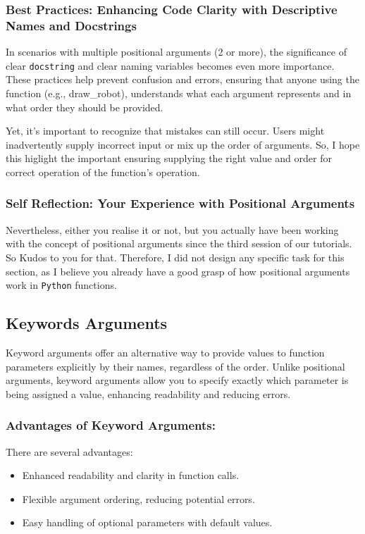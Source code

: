 \subsubsection{Best Practices: Enhancing Code Clarity with Descriptive Names and Docstrings}

In scenarios with multiple positional arguments (2 or more), the significance of clear \texttt{docstring} and clear naming variables becomes even more importance. These practices help prevent confusion and errors, ensuring that anyone using the function (e.g., draw\_robot), understands what each argument represents and in what order they should be provided.

Yet, it's important to recognize that mistakes can still occur. Users might inadvertently supply incorrect input or mix up the order of arguments. So, I hope this higlight the important ensuring supplying the right value and order for correct operation of the function's operation.

\subsubsection{Self Reflection: Your Experience with Positional Arguments}
Nevertheless, either you realise it or not, but you actually have been working with the concept of positional arguments since the third session of our tutorials. So Kudos to you for that. Therefore, I did not design any specific task for this section, as I believe you already have a good grasp of how positional arguments work in \texttt{Python} functions.


\newpage

\subsection{Keywords Arguments}
Keyword arguments offer an alternative way to provide values to function parameters explicitly by their names, regardless of the order. Unlike positional arguments, keyword arguments allow you to specify exactly which parameter is being assigned a value, enhancing readability and reducing errors.


\subsubsection{Advantages of Keyword Arguments:}

There are several advantages:
\begin{itemize}\setlength{\itemsep}{0pt}
    \item Enhanced readability and clarity in function calls.
    \item Flexible argument ordering, reducing potential errors.
    \item Easy handling of optional parameters with default values.
\end{itemize}

